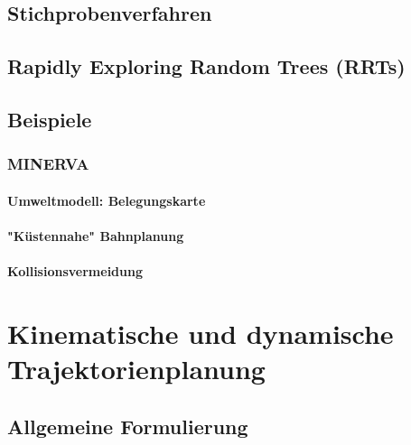 \documentclass[a4paper, 11pt, accentcolor = tud3b]{tudreport}
\begin{document}
			\subsection{Stichprobenverfahren} %

			\subsection{Rapidly Exploring Random Trees (RRTs)} %

			\subsection{Beispiele} %

				\subsubsection{MINERVA} %

					\paragraph{Umweltmodell: Belegungskarte} %

					\paragraph{"Küstennahe" Bahnplanung} %

					\paragraph{Kollisionsvermeidung} %

		\section{Kinematische und dynamische Trajektorienplanung} %

			\subsection{Allgemeine Formulierung} %
\end{document}
